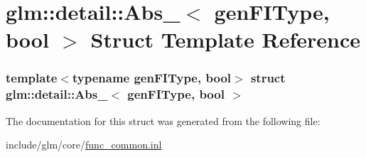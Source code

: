 \hypertarget{structglm_1_1detail_1_1Abs__}{\section{glm\-:\-:detail\-:\-:\-Abs\-\_\-$<$ gen\-F\-I\-Type, bool $>$ \-Struct \-Template \-Reference}
\label{structglm_1_1detail_1_1Abs__}
}
\subsubsection*{template$<$typename gen\-F\-I\-Type, bool$>$ struct glm\-::detail\-::\-Abs\-\_\-$<$ gen\-F\-I\-Type, bool $>$}



\-The documentation for this struct was generated from the following file\-:\begin{DoxyCompactItemize}
\item 
include/glm/core/\hyperlink{func__common_8inl}{func\-\_\-common.\-inl}\end{DoxyCompactItemize}
